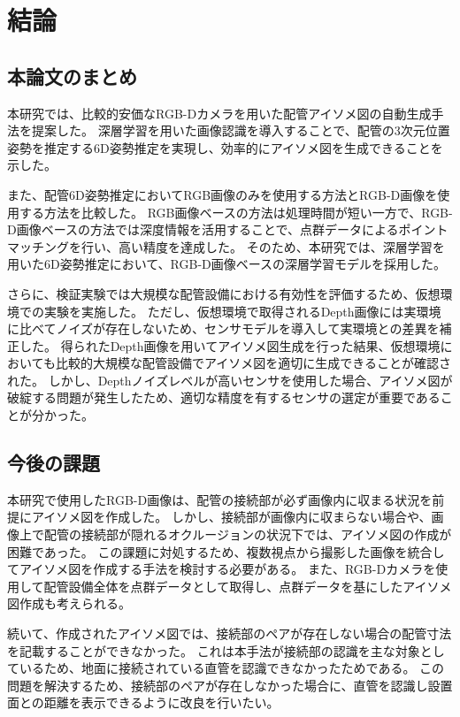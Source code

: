 ﻿\chapter{結論}
\section{本論文のまとめ}
本研究では、比較的安価なRGB-Dカメラを用いた配管アイソメ図の自動生成手法を提案した。
深層学習を用いた画像認識を導入することで、配管の3次元位置姿勢を推定する6D姿勢推定を実現し、効率的にアイソメ図を生成できることを示した。

また、配管6D姿勢推定においてRGB画像のみを使用する方法とRGB-D画像を使用する方法を比較した。
RGB画像ベースの方法は処理時間が短い一方で、RGB-D画像ベースの方法では深度情報を活用することで、点群データによるポイントマッチングを行い、高い精度を達成した。
そのため、本研究では、深層学習を用いた6D姿勢推定において、RGB-D画像ベースの深層学習モデルを採用した。

さらに、検証実験では大規模な配管設備における有効性を評価するため、仮想環境での実験を実施した。
ただし、仮想環境で取得されるDepth画像には実環境に比べてノイズが存在しないため、センサモデルを導入して実環境との差異を補正した。
得られたDepth画像を用いてアイソメ図生成を行った結果、仮想環境においても比較的大規模な配管設備でアイソメ図を適切に生成できることが確認された。
しかし、Depthノイズレベルが高いセンサを使用した場合、アイソメ図が破綻する問題が発生したため、適切な精度を有するセンサの選定が重要であることが分かった。

\section{今後の課題}
本研究で使用したRGB-D画像は、配管の接続部が必ず画像内に収まる状況を前提にアイソメ図を作成した。
しかし、接続部が画像内に収まらない場合や、画像上で配管の接続部が隠れるオクルージョンの状況下では、アイソメ図の作成が困難であった。
この課題に対処するため、複数視点から撮影した画像を統合してアイソメ図を作成する手法を検討する必要がある。
また、RGB-Dカメラを使用して配管設備全体を点群データとして取得し、点群データを基にしたアイソメ図作成も考えられる。

続いて、作成されたアイソメ図では、接続部のペアが存在しない場合の配管寸法を記載することができなかった。
これは本手法が接続部の認識を主な対象としているため、地面に接続されている直管を認識できなかったためである。
この問題を解決するため、接続部のペアが存在しなかった場合に、直管を認識し設置面との距離を表示できるように改良を行いたい。
